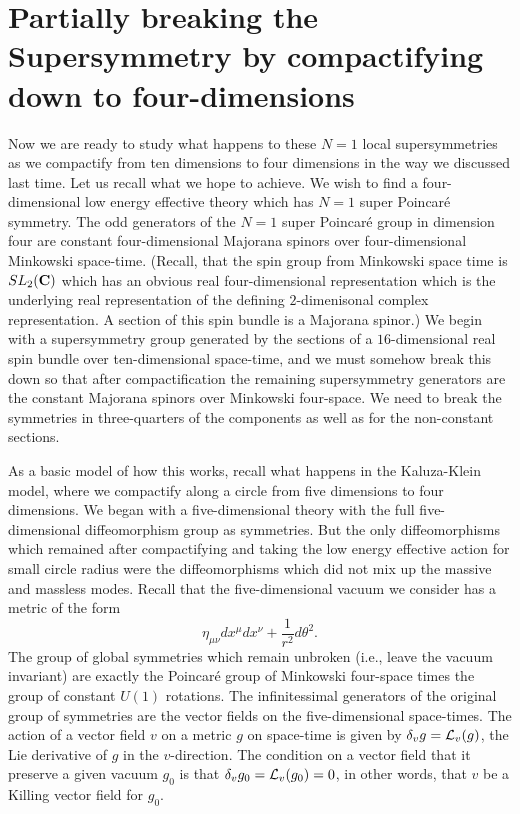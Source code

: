 \section{Partially breaking the Supersymmetry by compactifying down
to four-dimensions}
 
Now we are ready to study what happens to these $N=1$ local
supersymmetries as we compactify
from ten dimensions to four dimensions in the way we discussed last
time. 
Let us recall what we hope to achieve.  We wish to find a
four-dimensional low energy effective theory 
which has $N=1$ super Poincar\'e symmetry. The odd generators
of the $N=1$ super Poincar\'e group in dimension four are  constant
four-dimensional Majorana spinors over four-dimensional Minkowski
space-time. (Recall, that the spin group from Minkowski space time is
$SL_2({\bf C})$ which has an obvious real four-dimensional
representation which is the underlying real representation of the defining
$2$-dimenisonal complex representation.  A section of this spin bundle
is a Majorana spinor.) 
We begin with a supersymmetry group generated by the sections of a
$16$-dimensional real spin bundle over ten-dimensional space-time, and
we must somehow break this down so that after compactification the
remaining supersymmetry generators are the constant Majorana spinors
over Minkowski four-space. We need to break the symmetries in
three-quarters of the components as well as for the non-constant
sections. 

As a basic model of how this works, recall what happens in the
Kaluza-Klein model, where we compactify along a circle from five
dimensions to four dimensions. We began with a five-dimensional theory
with the full five-dimensional diffeomorphism group as symmetries. But
the only diffeomorphisms which remained after compactifying and taking
the low energy effective action for small circle radius were the
diffeomorphisms which did not mix up the massive and massless modes.
Recall that the five-dimensional vacuum we consider has a metric of
the form 
$$\eta_{\mu\nu}dx^\mu dx^\nu+\frac{1}{r^2}d\theta^2.$$ The group of global
symmetries which remain unbroken (i.e., leave the 
vacuum invariant) are exactly the
Poincar\'e group of Minkowski four-space times the group of constant
$U(1)$ rotations. 
The infinitessimal generators of the original group of
symmetries are the vector fields on the five-dimensional
space-times. The action of a vector field $v$ on a metric  $g$ on
space-time is given by
$\delta_vg={\cal L}_v(g)$, the Lie derivative of $g$ in the
$v$-direction. The condition on a vector field that it preserve a given
vacuum $g_0$ is that $\delta_vg_0={\cal L}_v(g_0)=0$,  in other words,
that $v$ be a Killing vector field for $g_0$. 

